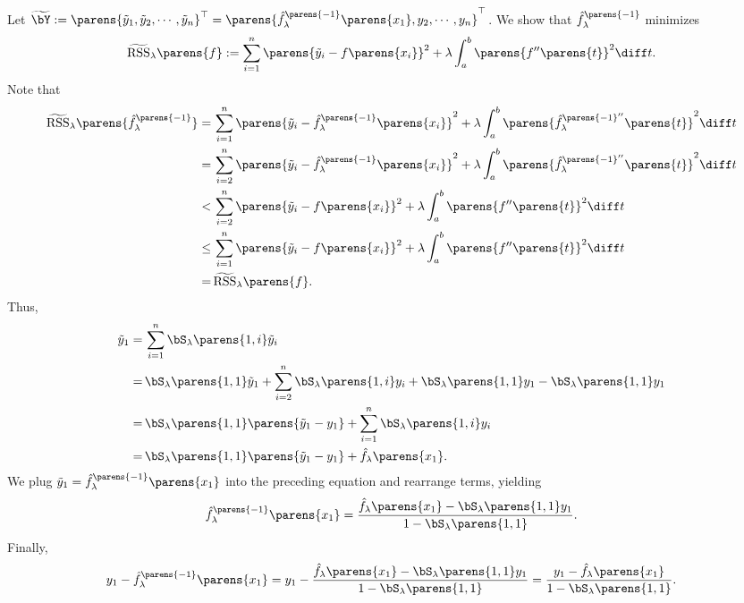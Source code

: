 \documentclass[12pt]{article}
\begin{document}
\begin{enumerate}[label=\textbf{\arabic*.}]
	Let $\widetilde{\bY} := \parens{\tilde{y}_1, \tilde{y}_2, \cdots, \tilde{y}_n}^\top = \parens{\hat{f}_{\lambda}^{\parens{-1}} \parens{x_1}, y_2, \cdots, y_n}^\top$. We show that $\hat{f}_{\lambda}^{\parens{-1}}$ minimizes 
	\begin{align*}
		\widetilde{\mathrm{RSS}}_{\lambda} \parens{f} := \sum_{i=1}^n \parens{\tilde{y}_i - f \parens{x_i}}^2 + \lambda \int_{a}^{b} \parens{f'' \parens{t}}^2 \diff t. 
	\end{align*}
	Note that 
	\begin{align*}
		\widetilde{\mathrm{RSS}}_{\lambda} \parens{ \hat{f}_{\lambda}^{\parens{-1}} } = & \, \sum_{i=1}^n \parens{\tilde{y}_i - \hat{f}_{\lambda}^{\parens{-1}} \parens{x_i}}^2 + \lambda \int_{a}^{b} \parens{ {\hat{f}_{\lambda}^{\parens{-1}''}} \parens{t}}^2 \diff t \\ 
		= & \, \sum_{i=2}^n \parens{\tilde{y}_i - \hat{f}_{\lambda}^{\parens{-1}} \parens{x_i}}^2 + \lambda \int_{a}^{b} \parens{ {\hat{f}_{\lambda}^{\parens{-1}''}} \parens{t}}^2 \diff t \\ 
		< & \, \sum_{i=2}^n \parens{\tilde{y}_i - f \parens{x_i}}^2 + \lambda \int_{a}^{b} \parens{ f'' \parens{t}}^2 \diff t \\ 
		\le & \, \sum_{i=1}^n \parens{\tilde{y}_i - f \parens{x_i}}^2 + \lambda \int_{a}^{b} \parens{ f'' \parens{t}}^2 \diff t \\ 
		= & \, \widetilde{\mathrm{RSS}}_{\lambda} \parens{f}. 
	\end{align*}
	Thus, 
	\begin{align*}
		\tilde{y}_1 = & \, \sum_{i=1}^n \bS_{\lambda} \parens{1, i} \tilde{y}_i \\ 
		= & \, \bS_{\lambda} \parens{1, 1} \tilde{y}_1 + \sum_{i=2}^n \bS_{\lambda} \parens{1, i} y_i + \bS_{\lambda} \parens{1, 1} y_1 - \bS_{\lambda} \parens{1, 1} y_1 \\ 
		= & \, \bS_{\lambda} \parens{1, 1} \parens{ \tilde{y}_1 - y_1} + \sum_{i=1}^n \bS_{\lambda} \parens{1, i} y_i \\ 
		= & \, \bS_{\lambda} \parens{1, 1} \parens{ \tilde{y}_1 - y_1} + \hat{f}_{\lambda} \parens{x_1}. 
	\end{align*}
	We plug $\tilde{y}_1 = \hat{f}_{\lambda}^{\parens{-1}} \parens{x_1}$ into the preceding equation and rearrange terms, yielding 
	\begin{align*}
		\hat{f}_{\lambda}^{\parens{-1}} \parens{x_1} = \frac{\hat{f}_{\lambda} \parens{x_1} - \bS_{\lambda} \parens{1, 1} y_1}{1 - \bS_{\lambda} \parens{1,1}}. 
	\end{align*}
	Finally, 
	\begin{align*}
		y_1 - \hat{f}_{\lambda}^{\parens{-1}} \parens{x_1} = y_1 - \frac{\hat{f}_{\lambda} \parens{x_1} - \bS_{\lambda} \parens{1, 1} y_1}{1 - \bS_{\lambda} \parens{1,1}} = \frac{y_1 - \hat{f}_{\lambda} \parens{x_1} }{1 - \bS_{\lambda} \parens{1,1}}. 
	\end{align*}
	

\end{enumerate}
\end{document}
